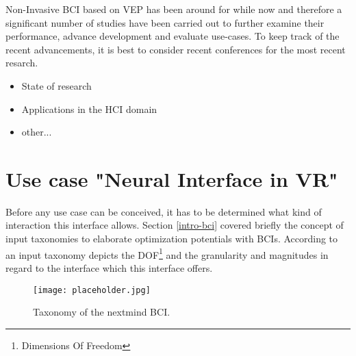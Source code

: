             Non-Invasive BCI based on VEP has been around for while now and therefore a significant number of studies have been carried out to further examine their performance, advance development and evaluate use-cases. To keep track of the recent advancements, it is best to consider recent conferences for the most recent resarch.


            \begin{itemize}
                \item State of research
                \item Applications in the HCI domain
                \item other...
            \end{itemize}


        \section{Use case "Neural Interface in VR"}

            Before any use case can be conceived, it has to be determined what kind of interaction this interface allows. Section \ref*{intro-bci} covered briefly the concept of input taxonomies to elaborate optimization potentials with BCIs. According to  an input taxonomy depicts the DOF\footnote{Dimensions Of Freedom} and the granularity and magnitudes in regard to the interface which this interface offers.

            \begin{figure}[h]     %
                \centering
                \texttt{[image: placeholder.jpg]} 
                \caption{Taxonomy of the nextmind BCI. }\label{bci-taxonomy}
            \end{figure}


